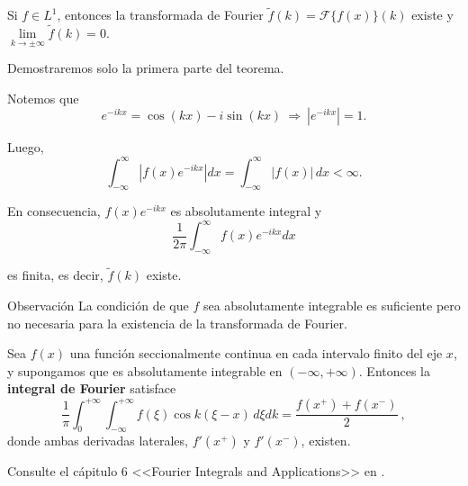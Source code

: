 \begin{teorema}
Si $f \in L^1$, entonces la transformada de Fourier $\tilde{f}(k) = \mathcal{F}\{f(x)\}(k)$ existe y $\lim\limits_{k \to \pm \infty} \tilde{f}(k) = 0$.
\end{teorema}

\begin{demo}

Demostraremos solo la primera parte del teorema.

Notemos que
$$e^{-ikx} = \cos(kx) - i \sin(kx) ~\Rightarrow~ |e^{-ikx}| = 1.$$

Luego,
$$ \int_{-\infty}^{\infty} |f(x) e^{-ikx}| dx =  \int_{- \infty}^{\infty} |f(x)| \,dx < \infty.$$

En consecuencia, $f(x) e^{-ikx}$ es absolutamente integral y
$$\frac{1}{2\pi} \int_{-\infty}^{\infty} f(x) e^{-ikx} dx$$

es finita, es decir, $\tilde{f}(k)$ existe. 
\end{demo}

\begin{obs}{Observación}
    La condición de que $f$ sea absolutamente integrable es suficiente pero no necesaria para la existencia de la transformada de Fourier.
\end{obs}

\begin{teorema}
    Sea $f(x)$ una función seccionalmente continua en cada intervalo finito del eje $x$, y supongamos que es absolutamente integrable en $(-\infty, + \infty)$. Entonces la \textbf{integral de Fourier} satisface
\begin{equation}
    \frac{1}{\pi} \int_0^{+\infty} \int_{-\infty}^{+\infty} f(\xi) \cos k(\xi-x) \,d\xi dk = \frac{f(x^+) + f(x^-)}{2} \ ,    
\end{equation}
donde ambas derivadas laterales, $f'(x^+)$ y $f'(x^-)$, existen.
\end{teorema}

\begin{demo}
Consulte el cápitulo 6 <<Fourier Integrals and Applications>> en \cite{Brown}.
\end{demo}


